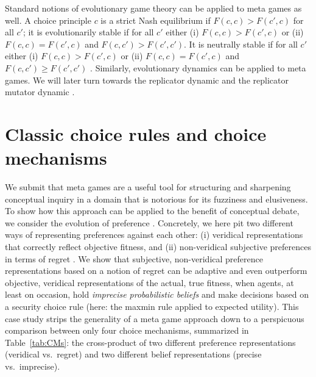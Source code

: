 \documentclass[fleqn,reqno,11pt]{article}
\begin{document}
Standard notions of evolutionary game theory can be applied to meta games as well. A choice
principle $c$ is a strict Nash equilibrium if $F(c,c) > F(c',c)$ for all $c'$; it is
evolutionarily stable if for all $c'$ either (i) $F(c,c) > F(c',c)$ or (ii) $F(c,c) = F(c',c)$
and $F(c,c') > F(c',c')$. It is neutrally stable if for all $c'$ either (i) $F(c,c) > F(c',c)$
or (ii) $F(c,c) = F(c',c)$ and $F(c,c') \ge F(c',c')$
\citep{Maynard-Smith1982:Evolution-and-t}. Similarly, evolutionary dynamics can be applied to
meta games. We will later turn towards the replicator dynamic
\citep{TaylorJonker1978:Evolutionary-St} and the replicator mutator dynamic
\citep[e.g.][]{Nowak2006:Evolutionary-Dy}.




\section{Classic choice rules and choice mechanisms}
\label{sec:basic-notions}

We submit that meta games are a useful tool for structuring and sharpening conceptual inquiry
in a domain that is notorious for its fuzziness and elusiveness. To show how this approach can
be applied to the benefit of conceptual debate, we consider the evolution of preference
\citep[e.g.,][]{algweib13,DekElyYlan07,RobSam11}. Concretely, we here pit two different ways of
representing preferences against each other: (i) veridical representations that correctly
reflect objective fitness, and (ii) non-veridical subjective preferences in terms of regret
\citep[e.g.,][]{Savage1951:The-theory-of-s,}. We show that subjective, non-veridical preference
representations based on a notion of regret can be adaptive and even outperform objective,
veridical representations of the actual, true fitness, when agents, at least on occasion, hold
\emph{imprecise probabilistic beliefs} \citep[e.g.,][]{gilsch89,levi74,gardsah82} and make
decisions based on a security choice rule (here: the maxmin rule applied to expected
utility). This case study strips the generality of a meta game approach down to a perspicuous
comparison between only four choice mechanisms, summarized in Table~\ref{tab:CMs}: the
cross-product of two different preference representations (veridical vs.~regret) and two
different belief representations (precise vs.~imprecise). 
\end{document}
